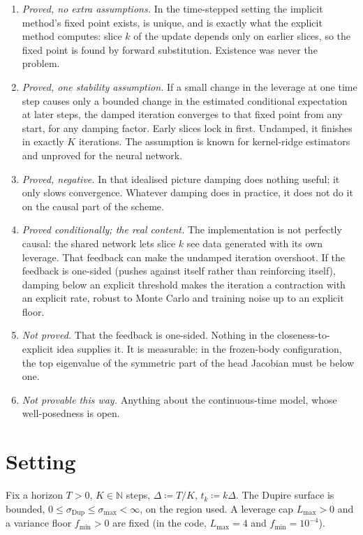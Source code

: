 \documentclass[11pt,a4paper]{article}
\theoremstyle{plain}
\theoremstyle{definition}
\theoremstyle{definition}
\newcommand{\N}{\mathbb{N}}
\newcommand{\sigDup}{\sigma_{\mathrm{Dup}}}
\newcommand{\Lmax}{L_{\max}}
\newcommand{\fmin}{f_{\min}}
\begin{document}
\begin{enumerate}
\item \emph{Proved, no extra assumptions.} In the time-stepped setting the implicit method's fixed point exists, is unique, and is exactly what the explicit method computes: slice $k$ of the update depends only on earlier slices, so the fixed point is found by forward substitution. Existence was never the problem.
\item \emph{Proved, one stability assumption.} If a small change in the leverage at one time step causes only a bounded change in the estimated conditional expectation at later steps, the damped iteration converges to that fixed point from any start, for any damping factor. Early slices lock in first. Undamped, it finishes in exactly $K$ iterations. The assumption is known for kernel-ridge estimators and unproved for the neural network.
\item \emph{Proved, negative.} In that idealised picture damping does nothing useful; it only slows convergence. Whatever damping does in practice, it does not do it on the causal part of the scheme.
\item \emph{Proved conditionally; the real content.} The implementation is not perfectly causal: the shared network lets slice $k$ see data generated with its own leverage. That feedback can make the undamped iteration overshoot. If the feedback is one-sided (pushes against itself rather than reinforcing itself), damping below an explicit threshold makes the iteration a contraction with an explicit rate, robust to Monte Carlo and training noise up to an explicit floor.
\item \emph{Not proved.} That the feedback is one-sided. Nothing in the closeness-to-explicit idea supplies it. It is measurable: in the frozen-body configuration, the top eigenvalue of the symmetric part of the head Jacobian must be below one.
\item \emph{Not provable this way.} Anything about the continuous-time model, whose well-posedness is open.
\end{enumerate}

\section{Setting}\label{sec:setting}

Fix a horizon $T > 0$, $K \in \N$ steps, $\Delta \coloneqq T/K$, $t_k \coloneqq k\Delta$. The Dupire surface is bounded, $0 \le \sigDup \le \sigma_{\max} < \infty$, on the region used. A leverage cap $\Lmax > 0$ and a variance floor $\fmin > 0$ are fixed (in the code, $\Lmax = 4$ and $\fmin = 10^{-4}$).
\end{document}

